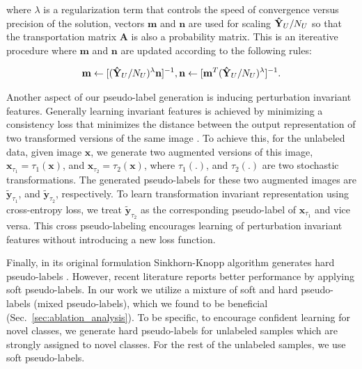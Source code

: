 \documentclass[runningheads]{eccv2022submission}
\begin{document}
\noindent where $\lambda$ is a regularization term that controls the speed of convergence versus precision of the solution, vectors $\mathbf{m}$ and $\mathbf{n}$ are used for scaling $\mathbf{\Hat{Y}}_U/N_U$ so that the transportation matrix $\mathbf{A}$ is also a probability matrix. This is an itereative procedure where $\mathbf{m}$ and $\mathbf{n}$ are updated according to the following rules: 


\setlength{\abovedisplayskip}{-6pt}
\setlength{\belowdisplayskip}{2pt}
\setlength{\abovedisplayshortskip}{0pt}
\setlength{\belowdisplayshortskip}{0pt}

\begin{align}
\label{eqn:sinkhon2}
   \mathbf{m} \gets [(\mathbf{\Hat{Y}}_U/N_U)^{\lambda}\mathbf{n}]^{-1}, \mathbf{n} \gets [\mathbf{m}^T(\mathbf{\Hat{Y}}_U/N_U)^{\lambda}]^{-1}.
\end{align}


Another aspect of our pseudo-label generation is inducing perturbation invariant features. Generally learning invariant features is achieved by minimizing a consistency loss that minimizes the distance between the output representation of two transformed versions of the same image \cite{NIPS2016_6333,NIPS2019_8749_MixMatch,Verma2019InterpolationCT}. To achieve this, for the unlabeled data, given image $\mathbf{x}$, we generate two augmented versions of this image, $\mathbf{x}_{\tau_1}=\tau_1(\mathbf{x})$, and $\mathbf{x}_{\tau_2}=\tau_2(\mathbf{x})$, where $\tau_1(.)$, and $\tau_2(.)$ are two stochastic transformations. The generated pseudo-labels for these two augmented images are $\mathbf{\tilde{y}}_{\tau_1}$, and $\mathbf{\tilde{y}}_{\tau_2}$, respectively. To learn transformation invariant representation using cross-entropy loss, we treat $\mathbf{\tilde{y}}_{\tau_2}$ as the corresponding pseudo-label of $\mathbf{x}_{\tau_1}$ and vice versa. This cross pseudo-labeling encourages learning of perturbation invariant features without introducing a new loss function.

Finally, in its original formulation Sinkhorn-Knopp algorithm generates hard pseudo-labels \cite{cuturi2013sinkhorn}. However, recent literature \cite{caron2020unsupervised} reports better performance by applying soft pseudo-labels. In our work we utilize a mixture of soft and hard pseudo-labels (mixed pseudo-labels), which we found to be beneficial (Sec.~\ref{sec:ablation_analysis}). To be specific, to encourage confident learning for novel classes, we generate hard pseudo-labels for unlabeled samples which are strongly assigned to novel classes. For the rest of the unlabeled samples, we use soft pseudo-labels.
\end{document}
